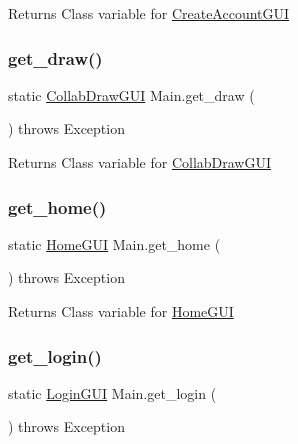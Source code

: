 \begin{DoxyReturn}{Returns}
Class variable for \hyperlink{class_create_account_g_u_i}{Create\+Account\+G\+UI} 
\end{DoxyReturn}
\mbox{\label{class_main_a8e7bcb41f4403124bc9bca5018d30e7a}} 
\subsubsection{\texorpdfstring{get\+\_\+draw()}{get\_draw()}}
{\footnotesize\ttfamily static \hyperlink{class_collab_draw_g_u_i}{Collab\+Draw\+G\+UI} Main.\+get\+\_\+draw (\begin{DoxyParamCaption}{ }\end{DoxyParamCaption}) throws Exception\hspace{0.3cm}{\ttfamily [static]}}

\begin{DoxyReturn}{Returns}
Class variable for \hyperlink{class_collab_draw_g_u_i}{Collab\+Draw\+G\+UI} 
\end{DoxyReturn}
\mbox{\label{class_main_a59e90cad9e7b3a6dc7e6f3ff60461552}} 
\subsubsection{\texorpdfstring{get\+\_\+home()}{get\_home()}}
{\footnotesize\ttfamily static \hyperlink{class_home_g_u_i}{Home\+G\+UI} Main.\+get\+\_\+home (\begin{DoxyParamCaption}{ }\end{DoxyParamCaption}) throws Exception\hspace{0.3cm}{\ttfamily [static]}}

\begin{DoxyReturn}{Returns}
Class variable for \hyperlink{class_home_g_u_i}{Home\+G\+UI} 
\end{DoxyReturn}
\mbox{\label{class_main_adbc9a9d0ef627e04ed81e7e61689dc01}} 
\subsubsection{\texorpdfstring{get\+\_\+login()}{get\_login()}}
{\footnotesize\ttfamily static \hyperlink{class_login_g_u_i}{Login\+G\+UI} Main.\+get\+\_\+login (\begin{DoxyParamCaption}{ }\end{DoxyParamCaption}) throws Exception\hspace{0.3cm}{\ttfamily [static]}}

